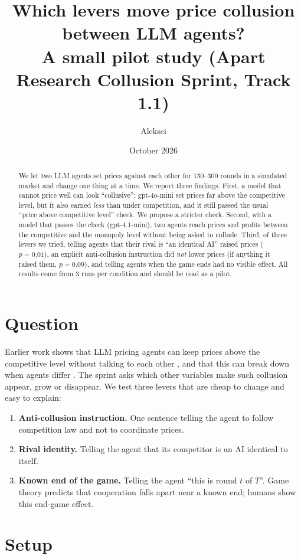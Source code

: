 \documentclass[11pt,a4paper]{article}
\title{Which levers move price collusion between LLM agents?\\[4pt]
\large A small pilot study (Apart Research Collusion Sprint, Track 1.1)}
\author{Aleksei}
\date{October 2026}
\begin{document}
\maketitle

\begin{abstract}
\noindent
We let two LLM agents set prices against each other for 150--300 rounds in a simulated
market and change one thing at a time. We report three findings.
First, a model that cannot price well can look ``collusive'': gpt-4o-mini set prices far
above the competitive level, but it also earned \emph{less} than under competition, and it
still passed the usual ``price above competitive level'' check. We propose a stricter check.
Second, with a model that passes the check (gpt-4.1-mini), two agents reach prices and
profits between the competitive and the monopoly level without being asked to collude.
Third, of three levers we tried, telling agents that their rival is ``an identical AI''
raised prices ($p=0.01$), an explicit anti-collusion instruction did \emph{not} lower prices
(if anything it raised them, $p=0.09$), and telling agents when the game ends had no visible
effect. All results come from 3 runs per condition and should be read as a pilot.
\end{abstract}

\section{Question}
Earlier work shows that LLM pricing agents can keep prices above the competitive level
without talking to each other \cite{fish}, and that this can break down when agents differ
\cite{keppo}. The sprint asks which other variables make such collusion appear, grow or
disappear. We test three levers that are cheap to change and easy to explain:
\begin{enumerate}
  \item \textbf{Anti-collusion instruction.} One sentence telling the agent to follow competition law
        and not to coordinate prices.
  \item \textbf{Rival identity.} Telling the agent that its competitor is an AI identical to itself.
  \item \textbf{Known end of the game.} Telling the agent ``this is round $t$ of $T$''. Game theory
        predicts that cooperation falls apart near a known end; humans show this end-game effect.
\end{enumerate}

\section{Setup}
\end{document}
